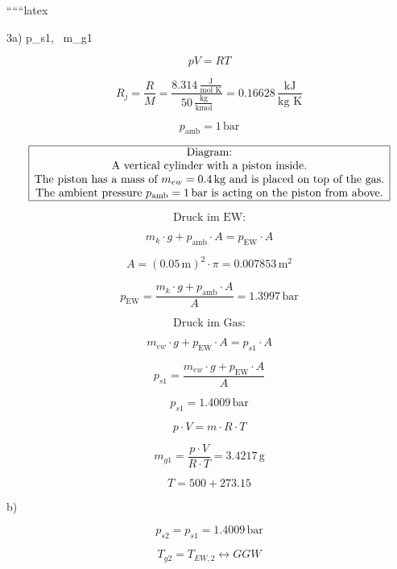 
``````latex


3a) \quad p_{s1}, \, m_{g1}

\[
pV = RT
\]

\[
R_j = \frac{R}{M} = \frac{8.314 \, \frac{\text{J}}{\text{mol K}}}{50 \, \frac{\text{kg}}{\text{kmol}}} = 0.16628 \, \frac{\text{kJ}}{\text{kg K}}
\]

\[
p_{\text{amb}} = 1 \, \text{bar}
\]

\[
\begin{array}{|c|}
\hline
\text{Diagram:} \\
\text{A vertical cylinder with a piston inside.} \\
\text{The piston has a mass of } m_{ew} = 0.4 \, \text{kg} \text{ and is placed on top of the gas.} \\
\text{The ambient pressure } p_{\text{amb}} = 1 \, \text{bar} \text{ is acting on the piston from above.} \\
\hline
\end{array}
\]

\[
\text{Druck im EW:}
\]

\[
m_{k} \cdot g + p_{\text{amb}} \cdot A = p_{\text{EW}} \cdot A
\]

\[
A = (0.05 \, \text{m})^2 \cdot \pi = 0.007853 \, \text{m}^2
\]

\[
p_{\text{EW}} = \frac{m_{k} \cdot g + p_{\text{amb}} \cdot A}{A} = 1.3997 \, \text{bar}
\]

\[
\text{Druck im Gas:}
\]

\[
m_{ew} \cdot g + p_{\text{EW}} \cdot A = p_{s1} \cdot A
\]

\[
p_{s1} = \frac{m_{ew} \cdot g + p_{\text{EW}} \cdot A}{A}
\]

\[
p_{s1} = 1.4009 \, \text{bar}
\]

\[
p \cdot V = m \cdot R \cdot T
\]

\[
m_{g1} = \frac{p \cdot V}{R \cdot T} = 3.4217 \, \text{g}
\]

\[
T = 500 + 273.15
\]

b) \quad {}

\[
p_{s2} = p_{s1} = 1.4009 \, \text{bar}
\]

\[
T_{g2} = T_{EW,2} \leftrightarrow GGW
\]


